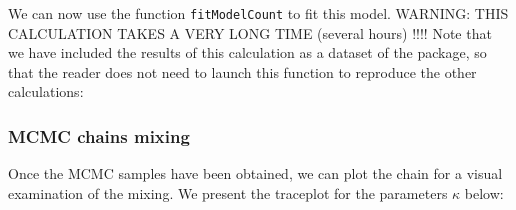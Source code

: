 \documentclass[a4paper]{article}
\newenvironment{Default Paragraph Font}{}{}
\begin{document}
We can now use the function \texttt{fitModelCount} to fit this
model. WARNING: THIS CALCULATION TAKES A VERY LONG TIME (several hours)
!!!! Note that we have included the results of this calculation as a
dataset of the package, so that the reader does not need to launch
this function to reproduce the other calculations:

\begin{knitrout}
\color{fgcolor}\begin{kframe}
\begin{alltt}
 \hlkwb{<-}  \hlstd{)}
\end{alltt}
\end{kframe}
\end{knitrout}



\subsubsection{MCMC chains mixing}
\label{sec:conv-model-fit}

Once the MCMC samples have been obtained, we can plot the chain for a
visual examination of the mixing. We present the traceplot for the
parameters $\kappa$ below:
\end{document}
